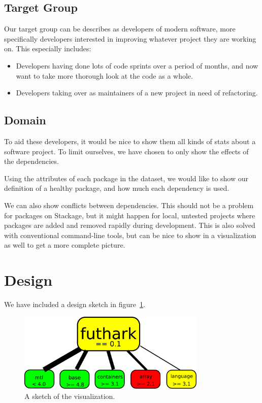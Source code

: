 \documentclass[a4paper,12pt]{article}
\begin{document}
\subsection{Target Group}

Our target group can be describes as developers of modern software, more
specifically developers interested in improving whatever project they are
working on.  This especially includes:

\begin{itemize}
\item Developers having done lots of code sprints over a period of months, and
now want to take more thorough look at the code as a whole.
\item Developers taking over as maintainers of a new project in need of
refactoring.
\end{itemize}


\subsection{Domain}

To aid these developers, it would be nice to show them all kinds of stats about
a software project.  To limit ourselves, we have chosen to only show the effects
of the dependencies.

Using the attributes of each package in the dataset, we would like to show our
definition of a healthy package, and how much each dependency is used.

We can also show conflicts between dependencies.  This should not be a problem
for packages on Stackage, but it might happen for local, untested projects where
packages are added and removed rapidly during development.  This is also solved
with conventional command-line tools, but can be nice to show in a visualization
as well to get a more complete picture.


\section{Design}

We have included a design sketch in figure~\ref{fig:sketch0}.

\begin{figure}[h!]
\begin{center}
\includegraphics[width=0.8\textwidth]{sketch0.pdf}
\caption{A sketch of the visualization.}
\label{fig:sketch0}
\end{center}
\end{figure}
\end{document}
